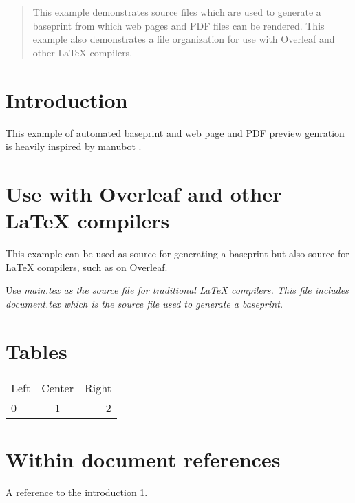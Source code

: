 



\begin{abstract}
This example demonstrates source files which are used to generate a baseprint from which
web pages and PDF files can be rendered.
This example also demonstrates a file organization for use with Overleaf and other LaTeX
compilers.
\end{abstract}

\section{Introduction}

\label{intro}

This example of automated baseprint and web page and PDF preview genration is heavily
inspired by manubot \cite{himmelstein_open_2019}.

\section{Use with Overleaf and other LaTeX compilers}

This example can be used as source for generating a baseprint but also source for
LaTeX compilers, such as on Overleaf.

Use \it{main.tex} as the source file for traditional LaTeX compilers.
This file includes \it{document.tex} which is the source file used to generate a
baseprint.

\section{Tables}

\begin{tabular}{l c r}
 Left & Center & Right \\
  0   &    1   &   2
\end{tabular}

\section{Within document references}

A reference to the introduction \ref{intro}.


\printbibliography %

